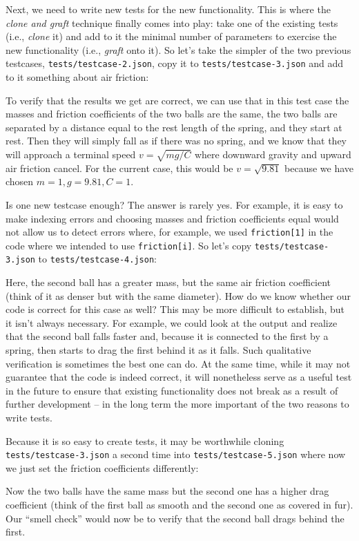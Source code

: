 \documentclass{article}
\begin{document}
Next, we need to write new tests for the new functionality. This is where the
\textit{clone and graft} technique finally comes into play: take one of the
existing tests (i.e., \textit{clone} it) and add to it the minimal number of
parameters to exercise the new functionality (i.e., \textit{graft} onto
it). So let's take the simpler of the two previous testcases,
\texttt{tests/testcase-2.json}, copy it to \texttt{tests/testcase-3.json} and
add to it something about air friction: 

To verify that the results we get are correct, we can use that in this test
case the masses and friction coefficients of the two balls are the same, the
two balls are separated by a distance equal to the rest length of the spring,
and they start at rest. Then they will simply fall as if there was no spring,
and we know that they will approach a terminal speed $v=\sqrt{mg/C}$ where
downward gravity and upward air friction cancel. For the current case, this
would be $v=\sqrt{9.81}$ because we have chosen $m=1, g=9.81, C=1$.

Is one new testcase enough? The answer is rarely yes. For example, it is easy
to make indexing errors and choosing masses and friction coefficients equal
would not allow us to detect errors where, for example, we used
\texttt{friction[1]} in the code where we intended to use \texttt{friction[i]}.
So let's copy \texttt{tests/testcase-3.json} to
\texttt{tests/testcase-4.json}:

Here, the second ball has a greater mass, but the same air friction
coefficient (think of it as denser but with the same diameter). How do we know
whether our code is correct for this case as well? This may be more difficult
to establish, but it isn't always necessary. For example, we could look at the
output and realize that the second ball falls faster and, because it is
connected to the first by a spring, then starts to drag the first behind it as
it falls. Such qualitative verification is sometimes the best one can do. At
the same time, while it may not guarantee that the code is indeed correct, it
will nonetheless serve as a useful test in the future to ensure that existing
functionality does not break as a result of further development -- in the long
term the more important of the two reasons to write tests.

Because it is so easy to create tests, it may be worthwhile cloning
\texttt{tests/testcase-3.json} a second time into
\texttt{tests/testcase-5.json} where now we just set the friction coefficients
differently:

Now the two balls have the same mass but the second one has a higher drag
coefficient (think of the first ball as smooth and the second one as covered
in fur). Our ``smell check'' would now be to verify that the second ball drags
behind the first.
\end{document}
